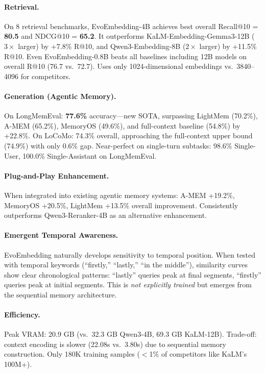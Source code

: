 \documentclass[11pt,a4paper]{article}
\begin{document}
\paragraph{Retrieval.} On 8 retrieval benchmarks, EvoEmbedding-4B achieves best overall Recall@10 = \textbf{80.5} and NDCG@10 = \textbf{65.2}. It outperforms KaLM-Embedding-Gemma3-12B ($3\times$ larger) by +7.8\% R@10, and Qwen3-Embedding-8B ($2\times$ larger) by +11.5\% R@10. Even EvoEmbedding-0.8B beats all baselines including 12B models on overall R@10 (76.7 vs.\ 72.7). Uses only 1024-dimensional embeddings vs.\ 3840--4096 for competitors.

\paragraph{Generation (Agentic Memory).} On LongMemEval: \textbf{77.6\%} accuracy---new SOTA, surpassing LightMem (70.2\%), A-MEM (65.2\%), MemoryOS (49.6\%), and full-context baseline (54.8\%) by +22.8\%. On LoCoMo: 74.3\% overall, approaching the full-context upper bound (74.9\%) with only 0.6\% gap. Near-perfect on single-turn subtasks: 98.6\% Single-User, 100.0\% Single-Assistant on LongMemEval.

\paragraph{Plug-and-Play Enhancement.} When integrated into existing agentic memory systems: A-MEM +19.2\%, MemoryOS +20.5\%, LightMem +13.5\% overall improvement. Consistently outperforms Qwen3-Reranker-4B as an alternative enhancement.

\paragraph{Emergent Temporal Awareness.} EvoEmbedding naturally develops sensitivity to temporal position. When tested with temporal keywords (``firstly,'' ``lastly,'' ``in the middle''), similarity curves show clear chronological patterns: ``lastly'' queries peak at final segments, ``firstly'' queries peak at initial segments. This is \emph{not explicitly trained} but emerges from the sequential memory architecture.

\paragraph{Efficiency.} Peak VRAM: 20.9 GB (vs.\ 32.3 GB Qwen3-4B, 69.3 GB KaLM-12B). Trade-off: context encoding is slower (22.08s vs.\ 3.80s) due to sequential memory construction. Only 180K training samples ($<$1\% of competitors like KaLM's 100M+).
\end{document}
